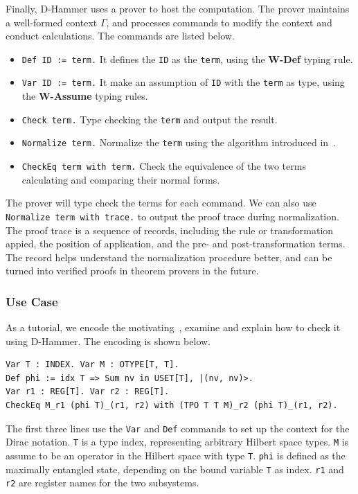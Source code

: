 Finally, D-Hammer uses a prover to host the computation. The prover maintains a well-formed context $\Gamma$, and processes commands to modify the context and conduct calculations. The commands are listed below.
\begin{itemize}
    \item \texttt{\textcolor{NavyBlue}{Def} ID := term.} It defines the \texttt{ID} as the \texttt{term}, using the \textbf{W-Def} typing rule.
    \item \texttt{\textcolor{NavyBlue}{Var} ID := term.} It make an assumption of \texttt{ID} with the \texttt{term} as type, using the \textbf{W-Assume} typing rules.
    \item \texttt{\textcolor{NavyBlue}{Check} term.} Type checking the \texttt{term} and output the result.
    \item \texttt{\textcolor{NavyBlue}{Normalize} term.} Normalize the \texttt{term} using the algorithm introduced in~.
    \item \texttt{\textcolor{NavyBlue}{CheckEq} term \textcolor{NavyBlue}{with} term.} Check the equivalence of the two terms calculating and comparing their normal forms.
\end{itemize}
The prover will type check the terms for each command. We can also use \texttt{\textcolor{NavyBlue}{Normalize} term \textcolor{NavyBlue}{with trace}.} to output the proof trace during normalization. The proof trace is a sequence of records, including the rule or transformation appied, the position of application, and the pre- and post-transformation terms. The record helps understand the normalization procedure better, and can be turned into verified proofs in theorem provers in the future.


\subsubsection{Use Case}
As a tutorial, we encode the motivating~, examine and explain how to check it using D-Hammer. The encoding is shown below.

    \begin{lstlisting}[style=dhammer]
Var T : INDEX. Var M : OTYPE[T, T].
Def phi := idx T => Sum nv in USET[T], |(nv, nv)>.
Var r1 : REG[T]. Var r2 : REG[T].
CheckEq M_r1 (phi T)_(r1, r2) with (TPO T T M)_r2 (phi T)_(r1, r2).
    \end{lstlisting}        

The first three lines use the \texttt{\textcolor{NavyBlue}{Var}} and \texttt{\textcolor{NavyBlue}{Def}} commands to set up the context for the Dirac notation.
\texttt{T} is a type index, representing arbitrary Hilbert space types. \texttt{M} is assume to be an operator in the Hilbert space with type \texttt{T}. \texttt{phi} is defined as the maximally entangled state, depending on the bound variable \texttt{T} as index.
\texttt{r1} and \texttt{r2} are register names for the two subsystems.

